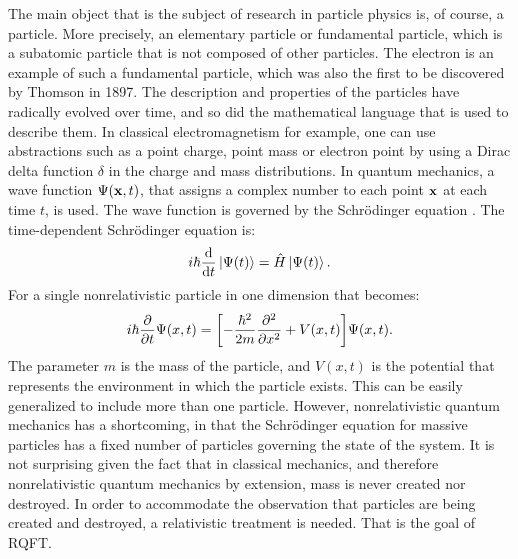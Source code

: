 The main object that is the subject of research in particle physics is, of course, a particle. More precisely, an elementary particle or fundamental particle, which is a subatomic particle that is not composed of other particles. The electron is an example of such a fundamental particle, which was also the first to be discovered by Thomson in 1897. The description and properties of the particles have radically evolved over time, and so did the mathematical language that is used to describe them. In classical electromagnetism for example, one can use abstractions such as a point charge, point mass or electron point by using a Dirac delta function $\delta$ in the charge and mass  distributions. In quantum mechanics, a wave function $\Psi(\vb{x},t)$,  that assigns a complex number to each point $\vb{x}$ at each time $t$, is used. The wave function is governed by the Schrödinger equation \cite{Liboff2002-vc,Cohen-Tannoudji1977-ms,Cohen-Tannoudji1977-rq}. The time-dependent Schrödinger equation is:
\begin{equation}
i\hbar\dv{t}\ket{\Psi(t)}=\hat{H}\ket{\Psi(t)}.
\label{eq:schrodinger-eq}
\end{equation}
For a single nonrelativistic particle in one dimension that becomes:
\begin{equation}
i\hbar\pdv{t}\Psi(x,t)=\qty[-\frac{\hbar^2}{2m}\pdv[2]{x}+V(x,t)] \Psi(x,t).
\label{eq:schrodinger-single-eq}
\end{equation}
The parameter $m$ is the mass of the particle, and $V(x,t)$ is the potential that represents the environment in which the particle exists. This can be easily generalized to include more than one particle. However, nonrelativistic quantum mechanics has a shortcoming, in that the Schrödinger equation for massive particles has a fixed number of particles governing the state of the system. It is not surprising given the fact that in classical mechanics, and therefore nonrelativistic quantum mechanics by extension, mass is never created nor destroyed. In order to accommodate the observation that particles are being created and destroyed, a relativistic treatment is needed. That is the goal of RQFT.

